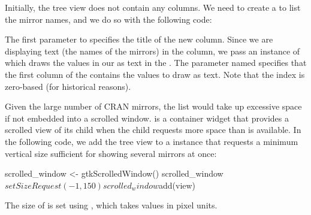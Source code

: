 \documentclass[article,shortnames]{jss}
\begin{document}
%
%


Initially, the tree view does not contain any columns. We need to
create a  to list the mirror names, and we do
so with the following code:
The first parameter to  specifies the title of
the new column. Since we are displaying text (the names of the
mirrors) in the column, we pass an instance of
 which draws the values in our
 as text in the . The parameter
named  specifies that the first column of the
 contains the values to draw as text. Note that the
index is zero-based (for historical reasons).

Given the large number of CRAN mirrors, the list would take up
excessive space
if not embedded into a scrolled window.  is a
container 
widget that provides a scrolled view of its child when the child
requests more
space than is available. In the following code, we add the tree view
to a  
instance that requests a minimum vertical size sufficient for showing
several mirrors at once:
\begin{Code}
scrolled_window <- gtkScrolledWindow()
scrolled_window$setSizeRequest(-1, 150)
scrolled_window$add(view)
\end{Code}
The size of  is set using
, which takes values in pixel units.
\end{document}
